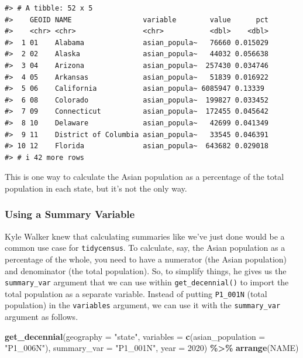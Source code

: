 \documentclass[
]{book}
\newenvironment{Shaded}{\begin{snugshade}}{\end{snugshade}}
\newcommand{\AttributeTok}[1]{\textcolor[rgb]{0.13,0.29,0.53}{#1}}
\newcommand{\DecValTok}[1]{\textcolor[rgb]{0.00,0.00,0.81}{#1}}
\newcommand{\FunctionTok}[1]{\textcolor[rgb]{0.13,0.29,0.53}{\textbf{#1}}}
\newcommand{\NormalTok}[1]{#1}
\newcommand{\SpecialCharTok}[1]{\textcolor[rgb]{0.81,0.36,0.00}{\textbf{#1}}}
\newcommand{\StringTok}[1]{\textcolor[rgb]{0.31,0.60,0.02}{#1}}
\begin{document}
\begin{verbatim}
#> # A tibble: 52 x 5
#>    GEOID NAME                 variable        value      pct
#>    <chr> <chr>                <chr>           <dbl>    <dbl>
#>  1 01    Alabama              asian_popula~   76660 0.015029
#>  2 02    Alaska               asian_popula~   44032 0.056638
#>  3 04    Arizona              asian_popula~  257430 0.034746
#>  4 05    Arkansas             asian_popula~   51839 0.016922
#>  5 06    California           asian_popula~ 6085947 0.13339 
#>  6 08    Colorado             asian_popula~  199827 0.033452
#>  7 09    Connecticut          asian_popula~  172455 0.045642
#>  8 10    Delaware             asian_popula~   42699 0.041349
#>  9 11    District of Columbia asian_popula~   33545 0.046391
#> 10 12    Florida              asian_popula~  643682 0.029018
#> # i 42 more rows
\end{verbatim}

This is one way to calculate the Asian population as a percentage of the total population in each state, but it's not the only way.

\hypertarget{using-a-summary-variable}{%
\subsubsection*{Using a Summary Variable}\label{using-a-summary-variable}}

Kyle Walker knew that calculating summaries like we've just done would be a common use case for \texttt{tidycensus}. To calculate, say, the Asian population as a percentage of the whole, you need to have a numerator (the Asian population) and denominator (the total population). So, to simplify things, he gives us the \texttt{summary\_var} argument that we can use within \texttt{get\_decennial()} to import the total population as a separate variable. Instead of putting \texttt{P1\_001N} (total population) in the \texttt{variables} argument, we can use it with the \texttt{summary\_var} argument as follows.

\begin{Shaded}
\begin{Highlighting}[]
\FunctionTok{get\_decennial}\NormalTok{(}\AttributeTok{geography =} \StringTok{"state"}\NormalTok{, }
              \AttributeTok{variables =} \FunctionTok{c}\NormalTok{(}\AttributeTok{asian\_population =} \StringTok{"P1\_006N"}\NormalTok{),}
              \AttributeTok{summary\_var =} \StringTok{"P1\_001N"}\NormalTok{,}
              \AttributeTok{year =} \DecValTok{2020}\NormalTok{) }\SpecialCharTok{\%\textgreater{}\%} 
  \FunctionTok{arrange}\NormalTok{(NAME)}
\end{Highlighting}
\end{Shaded}
\end{document}
